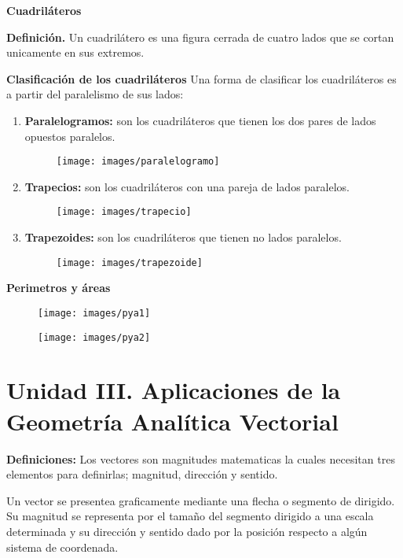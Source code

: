 \textbf{Cuadriláteros}

\textbf{Definición.} Un cuadrilátero es una figura cerrada de cuatro lados que se cortan unicamente en sus extremos.

\textbf{Clasificación de los cuadriláteros}
Una forma de clasificar los cuadriláteros es a partir del paralelismo de sus lados:
\begin{enumerate}
    \item \textbf{Paralelogramos:} son los cuadriláteros que tienen los dos pares de lados opuestos paralelos.
    \begin{figure}[H]
        \centering
        \texttt{[image: images/paralelogramo]}
    \end{figure}
    \item \textbf{Trapecios:} son los cuadriláteros con una pareja de lados paralelos.
    \begin{figure}[H]
        \centering
        \texttt{[image: images/trapecio]}
    \end{figure}
    \item \textbf{Trapezoides:} son los cuadriláteros que tienen no lados paralelos.
    \begin{figure}[H]
        \centering
        \texttt{[image: images/trapezoide]}
    \end{figure}
\end{enumerate}



\textbf{Perimetros y áreas}

\begin{figure}[H]
    \centering
    \texttt{[image: images/pya1]}
\end{figure}

\begin{figure}[H]
    \centering
    \texttt{[image: images/pya2]}
\end{figure}




\section{\large Unidad III. Aplicaciones de la Geometría Analítica Vectorial}

\textbf{Definiciones:} Los vectores son magnitudes matematicas la cuales necesitan tres elementos para definirlas; magnitud, dirección y sentido.

Un vector se presentea graficamente mediante una flecha o segmento de dirigido.
Su magnitud se representa por el tamaño del segmento dirigido a una escala determinada y su dirección y sentido dado por la posición respecto a algún sistema de coordenada.


